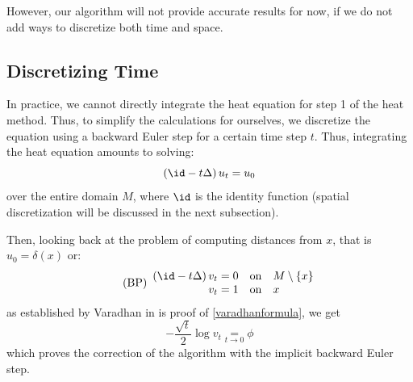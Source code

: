 \documentclass[math, info, english]{cours}
\begin{document}
However, our algorithm will not provide accurate results for now, if we do not add ways to discretize both time and space.

\subsection{Discretizing Time}
In practice, we cannot directly integrate the heat equation for step 1 of the heat method.
Thus, to simplify the calculations for ourselves, we discretize the equation using a backward Euler step for a certain time step $t$.
Thus, integrating the heat equation amounts to solving:
\begin{equation}
	\left( \id - t\Delta \right)u_{t} = u_{0}
\end{equation}
over the entire domain $M$, where $\id$ is the identity function (spatial discretization will be discussed in the next subsection).

Then, looking back at the problem of computing distances from $x$, that is $u_{0} = \delta(x)$ or:
\begin{equation}
	\tag{BP}
	\begin{array}{rcl}
		\left( \id - t\Delta \right)v_{t} = 0 & \rm on & M\setminus \{x\}\\
		v_{t} = 1 & \rm on & x
	\end{array}
	\label{boundaryproblem}
\end{equation}
as established by Varadhan in is proof of \ref{varadhanformula}, we get
\begin{equation}
	\tag{$\delta t$}
	-\frac{\sqrt{t}}{2}\log v_{t} \underset{t \to 0}{=} \phi
	\label{discretetime}
\end{equation}
which proves the correction of the algorithm with the implicit backward Euler step.
\end{document}

